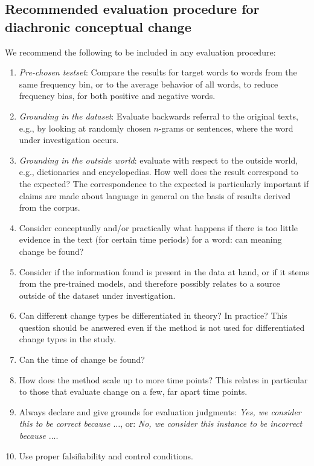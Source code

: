 \documentclass[output=paper]{langsci/langscibook}
\begin{document}
\subsection{Recommended evaluation procedure for diachronic conceptual change}
We recommend the following to be included in any evaluation procedure: 
\begin{enumerate}
\item \textit{Pre-chosen testset}: Compare the results for target words to words from the same frequency bin, or to the average behavior of all words, to reduce frequency bias, for both positive and negative words.
\item \textit{Grounding in the dataset}: Evaluate backwards referral to the original texts, e.g., by looking at randomly chosen $n$-grams or sentences, where the word under investigation occurs. 
\item \textit{Grounding in the outside world}: evaluate with respect to the outside world, e.g., dictionaries and encyclopedias. How well does the result correspond to the expected? The correspondence to the expected is particularly important if claims are made about language in general on the basis of results derived from the corpus. 
\item Consider conceptually and/or practically what happens if there is too little evidence in the text (for certain time periods) for a word: can meaning change be found?
\item Consider if the information found is present in the data at hand, or if it stems from the pre-trained models, and therefore possibly relates to a source outside of the dataset under investigation.
\item Can different change types be differentiated in theory? In practice? This question should be answered even if the method is not used for differentiated change types in the study. 
\item Can the time of change be found?
\item How does the method scale up to more time points? This relates in particular to those that evaluate change on a few, far apart time points.
\item Always declare and give grounds for evaluation judgments: \emph{Yes, we consider this to be correct because $\ldots$}, or: \emph{No, we consider this instance to be incorrect because $\ldots$}. 
\item Use proper falsifiability and control conditions.
\end{enumerate}
\end{document}
